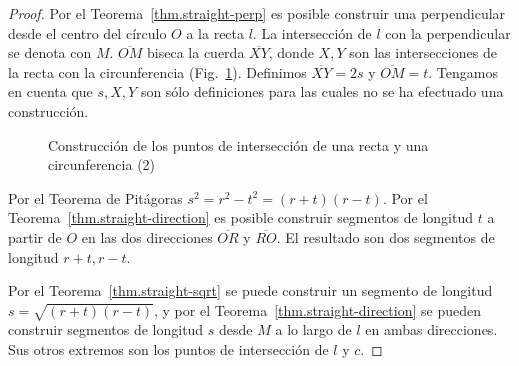 \begin{proof}
Por el Teorema~\ref{thm.straight-perp} es posible construir una perpendicular desde el centro del círculo $O$ a la recta $l$. La intersección de $l$ con la perpendicular se denota con $M$. $\overline{OM}$ biseca la cuerda $\overline{XY}$, donde $X, Y$ son las intersecciones de la recta con la circunferencia (Fig.~\ref{f.se-line-circle2}). Definimos $\overline{XY}=2s$ y $\overline{OM}=t$. Tengamos en cuenta que $s,X,Y$ son sólo definiciones para las cuales no se ha efectuado una construcción.
\begin{figure}[b]
\begin{center}
\end{center}
\caption{Construcción de los puntos de intersección de una recta y una circunferencia (2)}\label{f.se-line-circle2}
\end{figure}

Por el Teorema de Pitágoras $s^2=r^2-t^2=(r+t)(r-t)$. Por el Teorema~\ref{thm.straight-direction} es posible construir segmentos de longitud $t$ a partir de $O$ en las dos direcciones $\overline{OR}$ y $\overline{RO}$. El resultado son dos segmentos de longitud $r+t,r-t$.

Por el Teorema~\ref{thm.straight-sqrt} se puede construir un segmento de longitud $s=\sqrt{(r+t)(r-t)}$, y por el Teorema~\ref{thm.straight-direction} se pueden construir segmentos de longitud $s$ desde $M$ a lo largo de $l$ en ambas direcciones. Sus otros extremos son los puntos de intersección de $l$ y $c$.
\end{proof}

